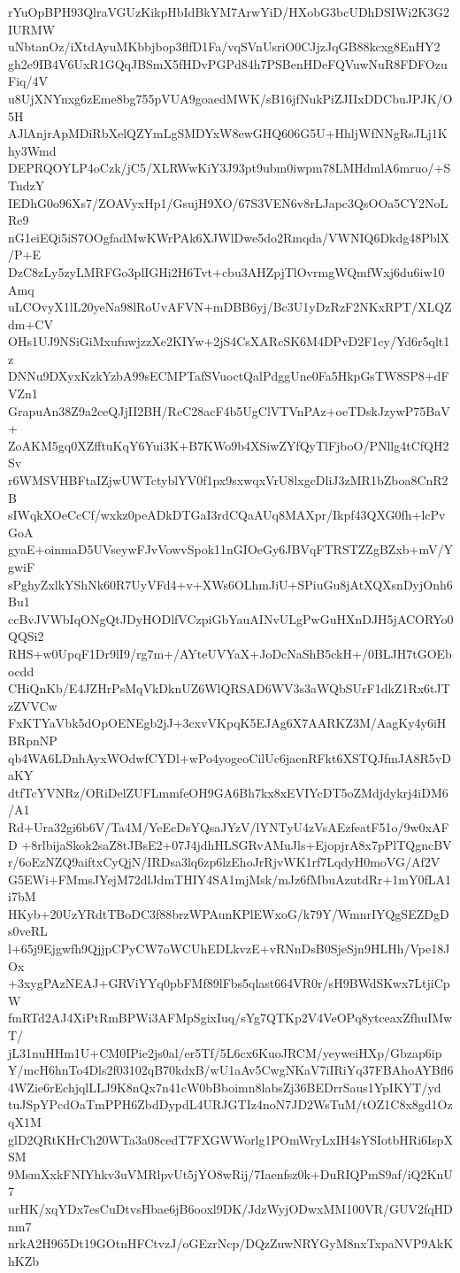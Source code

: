 rYuOpBPH93QlraVGUzKikpHbIdBkYM7ArwYiD/HXobG3bcUDhDSIWi2K3G2IURMW
uNbtanOz/iXtdAyuMKbbjbop3flfD1Fa/vqSVnUsriO0CJjzJqGB88kcxg8EnHY2
gh2e9IB4V6UxR1GQqJBSmX5fHDvPGPd84h7PSBenHDeFQVuwNuR8FDFOzuFiq/4V
u8UjXNYnxg6zEme8bg755pVUA9goaedMWK/sB16jfNukPiZJIIxDDCbuJPJK/O5H
AJlAnjrApMDiRbXelQZYmLgSMDYxW8ewGHQ606G5U+HhljWfNNgRsJLj1Khy3Wmd
DEPRQOYLP4oCzk/jC5/XLRWwKiY3J93pt9ubm0iwpm78LMHdmlA6mruo/+STndzY
IEDhG0o96Xs7/ZOAVyxHp1/GsujH9XO/67S3VEN6v8rLJapc3QsOOa5CY2NoLRe9
nG1eiEQi5iS7OOgfadMwKWrPAk6XJWlDwe5do2Rmqda/VWNIQ6Dkdg48PblX/P+E
DzC8zLy5zyLMRFGo3plIGHi2H6Tvt+cbu3AHZpjTlOvrmgWQmfWxj6du6iw10Amq
uLCOvyX1lL20yeNa98lRoUvAFVN+mDBB6yj/Bc3U1yDzRzF2NKxRPT/XLQZdm+CV
OHs1UJ9NSiGiMxufuwjzzXe2KIYw+2jS4CsXARcSK6M4DPvD2F1cy/Yd6r5qlt1z
DNNu9DXyxKzkYzbA99sECMPTafSVuoctQalPdggUne0Fa5HkpGsTW8SP8+dFVZn1
GrapuAn38Z9a2ceQJjII2BH/RcC28acF4b5UgClVTVnPAz+oeTDskJzywP75BaV+
ZoAKM5gq0XZfftuKqY6Yui3K+B7KWo9b4XSiwZYfQyTlFjboO/PNllg4tCfQH2Sv
r6WMSVHBFtaIZjwUWTctyblYV0f1px9sxwqxVrU8lxgcDliJ3zMR1bZboa8CnR2B
sIWqkXOeCcCf/wxkz0peADkDTGaI3rdCQaAUq8MAXpr/Ikpf43QXG0fh+lcPvGoA
gyaE+oinmaD5UVseywFJvVowvSpok11nGIOeGy6JBVqFTRSTZZgBZxb+mV/YgwiF
sPghyZxlkYShNk60R7UyVFd4+v+XWs6OLhmJiU+SPiuGu8jAtXQXsnDyjOnh6Bu1
ccBvJVWbIqONgQtJDyHODlfVCzpiGbYauAINvULgPwGuHXnDJH5jACORYo0QQSi2
RHS+w0UpqF1Dr9lI9/rg7m+/AYteUVYaX+JoDcNaShB5ckH+/0BLJH7tGOEbocdd
CHiQnKb/E4JZHrPsMqVkDknUZ6WlQRSAD6WV3s3aWQbSUrF1dkZ1Rx6tJTzZVVCw
FxKTYaVbk5dOpOENEgb2jJ+3cxvVKpqK5EJAg6X7AARKZ3M/AagKy4y6iHBRpnNP
qb4WA6LDnhAyxWOdwfCYDl+wPo4yogeoCilUc6jaenRFkt6XSTQJfmJA8R5vDaKY
dtfTcYVNRz/ORiDelZUFLmmfeOH9GA6Bh7kx8xEVIYcDT5oZMdjdykrj4iDM6/A1
Rd+Ura32gi6b6V/Ta4M/YeEcDsYQsaJYzV/lYNTyU4zVsAEzfeatF51o/9w0xAFD
+8rlbijaSkok2saZ8tJBsE2+07J4jdhHLSGRvAMuJls+EjopjrA8x7pPlTQgncBV
r/6oEzNZQ9aiftxCyQjN/IRDsa3lq6zp6lzEhoJrRjvWK1rf7LqdyH0moVG/Af2V
G5EWi+FMmsJYejM72dlJdmTHIY4SA1mjMsk/mJz6fMbuAzutdRr+1mY0fLA1i7bM
HKyb+20UzYRdtTBoDC3f88brzWPAunKPlEWxoG/k79Y/WmnrIYQgSEZDgDs0veRL
l+65j9Ejgwfh9QjjpCPyCW7oWCUhEDLkvzE+vRNnDsB0SjeSjn9HLHh/Vpe18JOx
+3xygPAzNEAJ+GRViYYq0pbFMf89lFbs5qlast664VR0r/sH9BWdSKwx7LtjiCpW
fmRTd2AJ4XiPtRmBPWi3AFMpSgixIuq/sYg7QTKp2V4VeOPq8ytceaxZfhuIMwT/
jL31nuHHm1U+CM0IPie2js0al/er5Tf/5L6cx6KuoJRCM/yeyweiHXp/Gbzap6ip
Y/mcH6hnTo4Dls2f03102qB70kdxB/wU1aAv5CwgNKaV7iIRiYq37FBAhoAYBfl6
4WZie6rEchjqlLLJ9K8nQx7n41cW0bBboimn8labsZj36BEDrrSaus1YpIKYT/yd
tuJSpYPcdOaTmPPH6ZbdDypdL4URJGTIz4noN7JD2WsTuM/tOZ1C8x8gd1OzqX1M
glD2QRtKHrCh20WTa3a08cedT7FXGWWorlg1POmWryLxIH4sYSIotbHRi6IspXSM
9MsmXxkFNIYhkv3uVMRlpvUt5jYO8wRij/7Iaenfsz0k+DuRIQPmS9af/iQ2KnU7
urHK/xqYDx7esCuDtvsHbae6jB6ooxl9DK/JdzWyjODwxMM100VR/GUV2fqHDnm7
nrkA2H965Dt19GOtnHFCtvzJ/oGEzrNcp/DQzZuwNRYGyM8nxTxpaNVP9AkKhKZb
